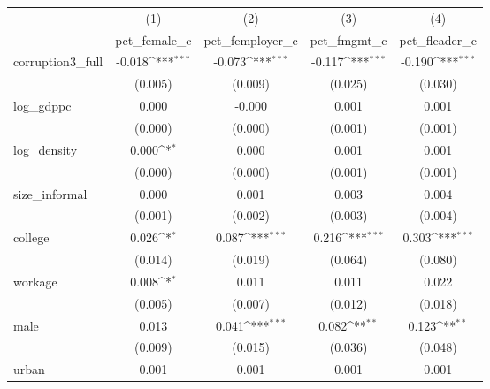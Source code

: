 {
\def\sym#1{\ifmmode^{#1}\else\(^{#1}\)\fi}
\begin{tabular}{l*{4}{c}}
\hline\hline
            &\multicolumn{1}{c}{(1)}&\multicolumn{1}{c}{(2)}&\multicolumn{1}{c}{(3)}&\multicolumn{1}{c}{(4)}\\
            &\multicolumn{1}{c}{pct\_female\_c}&\multicolumn{1}{c}{pct\_femployer\_c}&\multicolumn{1}{c}{pct\_fmgmt\_c}&\multicolumn{1}{c}{pct\_fleader\_c}\\
\hline
corruption3\_full&      -0.018\sym{***}&      -0.073\sym{***}&      -0.117\sym{***}&      -0.190\sym{***}\\
            &     (0.005)         &     (0.009)         &     (0.025)         &     (0.030)         \\
[1em]
log\_gdppc   &       0.000         &      -0.000         &       0.001         &       0.001         \\
            &     (0.000)         &     (0.000)         &     (0.001)         &     (0.001)         \\
[1em]
log\_density &       0.000\sym{*}  &       0.000         &       0.001         &       0.001         \\
            &     (0.000)         &     (0.000)         &     (0.001)         &     (0.001)         \\
[1em]
size\_informal&       0.000         &       0.001         &       0.003         &       0.004         \\
            &     (0.001)         &     (0.002)         &     (0.003)         &     (0.004)         \\
[1em]
college     &       0.026\sym{*}  &       0.087\sym{***}&       0.216\sym{***}&       0.303\sym{***}\\
            &     (0.014)         &     (0.019)         &     (0.064)         &     (0.080)         \\
[1em]
workage     &       0.008\sym{*}  &       0.011         &       0.011         &       0.022         \\
            &     (0.005)         &     (0.007)         &     (0.012)         &     (0.018)         \\
[1em]
male        &       0.013         &       0.041\sym{***}&       0.082\sym{**} &       0.123\sym{**} \\
            &     (0.009)         &     (0.015)         &     (0.036)         &     (0.048)         \\
[1em]
urban       &       0.001         &       0.001         &       0.001         &       0.001         \\

\end{tabular}}
